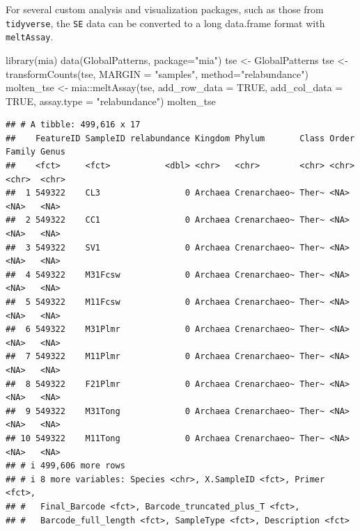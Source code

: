 \documentclass[
]{book}
\newenvironment{Shaded}{\begin{snugshade}}{\end{snugshade}}
\newcommand{\AttributeTok}[1]{\textcolor[rgb]{0.77,0.63,0.00}{#1}}
\newcommand{\ConstantTok}[1]{\textcolor[rgb]{0.00,0.00,0.00}{#1}}
\newcommand{\FunctionTok}[1]{\textcolor[rgb]{0.00,0.00,0.00}{#1}}
\newcommand{\NormalTok}[1]{#1}
\newcommand{\OtherTok}[1]{\textcolor[rgb]{0.56,0.35,0.01}{#1}}
\newcommand{\SpecialCharTok}[1]{\textcolor[rgb]{0.00,0.00,0.00}{#1}}
\newcommand{\StringTok}[1]{\textcolor[rgb]{0.31,0.60,0.02}{#1}}
\begin{document}
For several custom analysis and visualization packages, such as those from
\texttt{tidyverse}, the \texttt{SE} data can be converted to a long data.frame format with
\texttt{meltAssay}.

\begin{Shaded}
\begin{Highlighting}[]
\FunctionTok{library}\NormalTok{(mia)}
\FunctionTok{data}\NormalTok{(GlobalPatterns, }\AttributeTok{package=}\StringTok{"mia"}\NormalTok{)}
\NormalTok{tse }\OtherTok{\textless{}{-}}\NormalTok{ GlobalPatterns}
\NormalTok{tse }\OtherTok{\textless{}{-}} \FunctionTok{transformCounts}\NormalTok{(tse, }\AttributeTok{MARGIN =} \StringTok{"samples"}\NormalTok{, }\AttributeTok{method=}\StringTok{"relabundance"}\NormalTok{)}
\NormalTok{molten\_tse }\OtherTok{\textless{}{-}}\NormalTok{ mia}\SpecialCharTok{::}\FunctionTok{meltAssay}\NormalTok{(tse,}
                        \AttributeTok{add\_row\_data =} \ConstantTok{TRUE}\NormalTok{,}
                        \AttributeTok{add\_col\_data =} \ConstantTok{TRUE}\NormalTok{,}
                        \AttributeTok{assay.type =} \StringTok{"relabundance"}\NormalTok{)}
\NormalTok{molten\_tse}
\end{Highlighting}
\end{Shaded}

\begin{verbatim}
## # A tibble: 499,616 x 17
##    FeatureID SampleID relabundance Kingdom Phylum       Class Order Family Genus
##    <fct>     <fct>           <dbl> <chr>   <chr>        <chr> <chr> <chr>  <chr>
##  1 549322    CL3                 0 Archaea Crenarchaeo~ Ther~ <NA>  <NA>   <NA> 
##  2 549322    CC1                 0 Archaea Crenarchaeo~ Ther~ <NA>  <NA>   <NA> 
##  3 549322    SV1                 0 Archaea Crenarchaeo~ Ther~ <NA>  <NA>   <NA> 
##  4 549322    M31Fcsw             0 Archaea Crenarchaeo~ Ther~ <NA>  <NA>   <NA> 
##  5 549322    M11Fcsw             0 Archaea Crenarchaeo~ Ther~ <NA>  <NA>   <NA> 
##  6 549322    M31Plmr             0 Archaea Crenarchaeo~ Ther~ <NA>  <NA>   <NA> 
##  7 549322    M11Plmr             0 Archaea Crenarchaeo~ Ther~ <NA>  <NA>   <NA> 
##  8 549322    F21Plmr             0 Archaea Crenarchaeo~ Ther~ <NA>  <NA>   <NA> 
##  9 549322    M31Tong             0 Archaea Crenarchaeo~ Ther~ <NA>  <NA>   <NA> 
## 10 549322    M11Tong             0 Archaea Crenarchaeo~ Ther~ <NA>  <NA>   <NA> 
## # i 499,606 more rows
## # i 8 more variables: Species <chr>, X.SampleID <fct>, Primer <fct>,
## #   Final_Barcode <fct>, Barcode_truncated_plus_T <fct>,
## #   Barcode_full_length <fct>, SampleType <fct>, Description <fct>
\end{verbatim}
\end{document}
